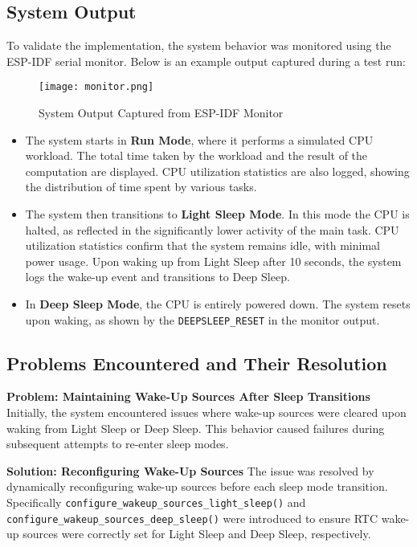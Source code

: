 \documentclass[a4paper, 11pt]{article}
\begin{document}
    \subsection{System Output}
    
    To validate the implementation, the system behavior was monitored using the ESP-IDF serial monitor. Below is an example output captured during a test run:
    
    \begin{figure}[h!]
        \centering
        \texttt{[image: monitor.png]}
        \caption{System Output Captured from ESP-IDF Monitor}
        \label{fig:system_output}
    \end{figure}

    \begin{itemize}
        \item The system starts in \textbf{Run Mode}, where it performs a simulated CPU workload. The total time taken by the workload and the result of the computation are displayed. CPU utilization statistics are also logged, showing the distribution of time spent by various tasks.
        \item The system then transitions to \textbf{Light Sleep Mode}. In this mode the CPU is halted, as reflected in the significantly lower activity of the main task. CPU utilization statistics confirm that the system remains idle, with minimal power usage. Upon waking up from Light Sleep after 10 seconds, the system logs the wake-up event and transitions to Deep Sleep.
        \item In \textbf{Deep Sleep Mode}, the CPU is entirely powered down. The system resets upon waking, as shown by the \texttt{DEEPSLEEP\_RESET} in the monitor output.
    \end{itemize}

    \subsection{Problems Encountered and Their Resolution}
    
    \textbf{Problem: Maintaining Wake-Up Sources After Sleep Transitions}  
    Initially, the system encountered issues where wake-up sources were cleared upon waking from Light Sleep or Deep Sleep. This behavior caused failures during subsequent attempts to re-enter sleep modes.
    
    \textbf{Solution: Reconfiguring Wake-Up Sources}  
    The issue was resolved by dynamically reconfiguring wake-up sources before each sleep mode transition. Specifically \texttt{configure\_wakeup\_sources\_light\_sleep()} and \texttt{configure\_wakeup\_sources\_deep\_sleep()} were introduced to ensure RTC wake-up sources were correctly set for Light Sleep and Deep Sleep, respectively.
\end{document}

